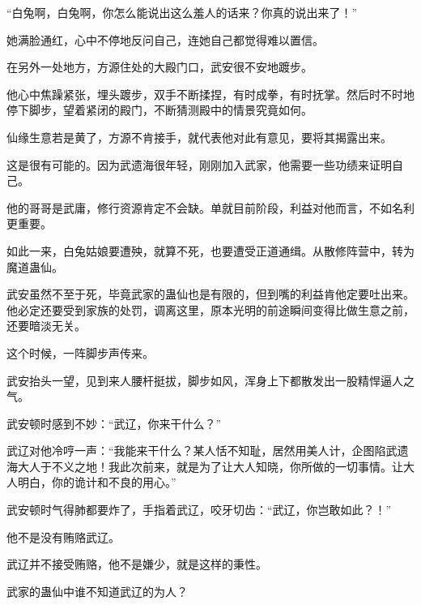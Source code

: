 \begin{this_body}
“白兔啊，白兔啊，你怎么能说出这么羞人的话来？你真的说出来了！”

她满脸通红，心中不停地反问自己，连她自己都觉得难以置信。

在另外一处地方，方源住处的大殿门口，武安很不安地踱步。

他心中焦躁紧张，埋头踱步，双手不断揉捏，有时成拳，有时抚掌。然后时不时地停下脚步，望着紧闭的殿门，不断猜测殿中的情景究竟如何。

仙缘生意若是黄了，方源不肯接手，就代表他对此有意见，要将其揭露出来。

这是很有可能的。因为武遗海很年轻，刚刚加入武家，他需要一些功绩来证明自己。

他的哥哥是武庸，修行资源肯定不会缺。单就目前阶段，利益对他而言，不如名利更重要。

如此一来，白兔姑娘要遭殃，就算不死，也要遭受正道通缉。从散修阵营中，转为魔道蛊仙。

武安虽然不至于死，毕竟武家的蛊仙也是有限的，但到嘴的利益肯他定要吐出来。他必定还要受到家族的处罚，调离这里，原本光明的前途瞬间变得比做生意之前，还要暗淡无关。

这个时候，一阵脚步声传来。

武安抬头一望，见到来人腰杆挺拔，脚步如风，浑身上下都散发出一股精悍逼人之气。

武安顿时感到不妙：“武辽，你来干什么？”

武辽对他冷哼一声：“我能来干什么？某人恬不知耻，居然用美人计，企图陷武遗海大人于不义之地！我此次前来，就是为了让大人知晓，你所做的一切事情。让大人明白，你的诡计和不良的用心。”

武安顿时气得肺都要炸了，手指着武辽，咬牙切齿：“武辽，你岂敢如此？！”

他不是没有贿赂武辽。

武辽并不接受贿赂，他不是嫌少，就是这样的秉性。

武家的蛊仙中谁不知道武辽的为人？

\end{this_body}

